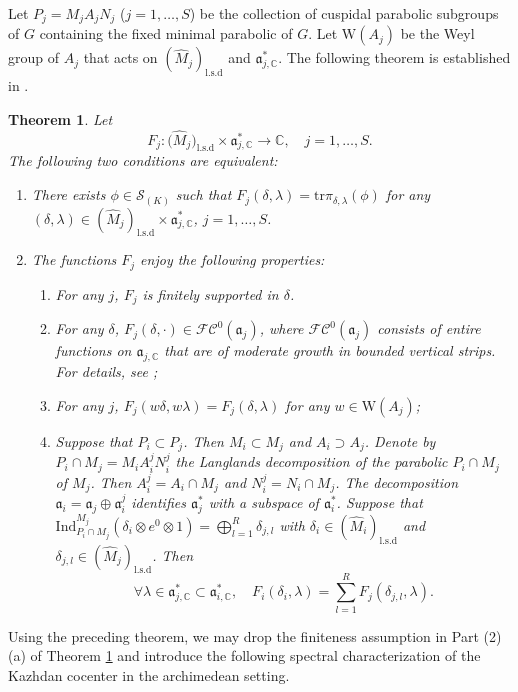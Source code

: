 \documentclass[iccmp]{ipbook}
\newcommand{\BC}{{\mathbb {C}}}
\newcommand{\CC}{{\mathcal {C}}}
\newcommand{\CF}{{\mathcal {F}}}
\newcommand{\CS}{{\mathcal {S}}}
\newcommand{\Fa}{{\mathfrak {a}}}
\newcommand{\RW}{{\mathrm {W}}}
\newcommand{\Ind}{{\mathrm{Ind}}}
\newcommand{\tr}{{\mathrm{tr}}}
\def\del{{\delta}}
\def\lam{{\lambda}}
\newtheorem{thm}{Theorem}[subsection]
\begin{document}
Let $P_j = M_jA_jN_j$ ($j=1,\ldots,S$) be the collection of cuspidal parabolic subgroups of $G$ containing the fixed minimal parabolic of $G$. Let $\RW(A_j)$ be the Weyl group of $A_j$ that acts on $(\hat{M}_j)_{\mathrm{l.s.d}}$ and $\Fa^*_{j,\BC}$. The following theorem is established in \cite[Théorème~1.9]{MR0860667}.
\begin{thm}\label{thm:delorme-K-finite-Schwartz}
Let
$$
F_j:
\big(
\hat{M}_j
\big)_{\mathrm{l.s.d}}
\times \Fa^*_{j,\BC}\to \BC,\quad j=1,\ldots,S.
$$
The following two conditions are equivalent:
\begin{enumerate}
\item There exists $\phi\in \CS_{(K)}$ such that $F_j(\del,\lam) = \tr\pi_{\del,\lam}(\phi)$ for any $(\del,\lam)\in (\hat{M}_j)_{\mathrm{l.s.d}}\times \Fa^*_{j,\BC}$, $j=1,\ldots,S$.

\item The functions $F_j$ enjoy the following properties:
\begin{enumerate}
\item For any $j$, $F_j$ is finitely supported in $\del$.

\item For any $\del$, $F_j(\del,\cdot)\in \CF\CC^0(\Fa_j)$, where $\CF\CC^0(\Fa_j)$ consists of entire functions on $\Fa_{j,\BC}$ that are of moderate growth in bounded vertical strips. For details, see \cite[p.696]{MR0860667};

\item For any $j$, $F_j(w\del,w\lam) = F_j(\del,\lam)$ for any $w\in \RW(A_j)$;

\item Suppose that $P_i\subset P_j$. Then $M_i\subset M_j$ and $A_i\supset A_j$. Denote by $P_i\cap M_j = M_iA^j_iN^j_i$ the Langlands decomposition of the parabolic $P_i\cap M_j$ of $M_j$. Then $A^j_i = A_i\cap M_j$ and $N^j_i = N_i\cap M_j$. The decomposition $\Fa_i = \Fa_j\oplus \Fa^j_i$ identifies $\Fa^*_j$ with a subspace of $\Fa^*_i$. Suppose that $\Ind^{M_j}_{P_i\cap M_j}(\del_i\otimes e^0\otimes 1) = \bigoplus_{l=1}^R \del_{j,l}$ with $\del_i\in (\hat{M}_i)_{\mathrm{l.s.d}}$ and $\del_{j,l}\in (\hat{M}_j)_{\mathrm{l.s.d}}$. Then
$$
\forall \lam\in \Fa^*_{j,\BC}\subset \Fa^*_{i,\BC}, \quad 
F_i(\del_i,\lam) = 
\sum_{l=1}^R F_j(\del_{j,l},\lam).
$$
\end{enumerate}
\end{enumerate}
\end{thm}
Using the preceding theorem, we may drop the finiteness assumption in Part (2)(a) of Theorem \ref{thm:delorme-K-finite-Schwartz} and introduce the following spectral characterization of the Kazhdan cocenter in the archimedean setting.
\end{document}

